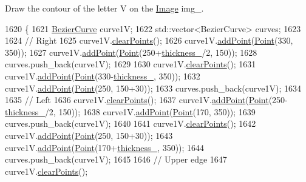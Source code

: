 Draw the contour of the letter V on the \mbox{\hyperlink{class_image}{Image}} img\+\_\+. 


\begin{DoxyCode}
1620                \{
1621     \mbox{\hyperlink{class_bezier_curve}{BezierCurve}} curve1V;
1622     std::vector<BezierCurve> curves;
1623 
1624     \textcolor{comment}{// Right}
1625     curve1V.\mbox{\hyperlink{class_bezier_curve_a0ba8ce66d5af5971ae6a1b506029728e}{clearPoints}}();
1626     curve1V.\mbox{\hyperlink{class_bezier_curve_a38d16c18b36ae45619b05e26e226cf34}{addPoint}}(\mbox{\hyperlink{class_point}{Point}}(330, 350));
1627     curve1V.\mbox{\hyperlink{class_bezier_curve_a38d16c18b36ae45619b05e26e226cf34}{addPoint}}(\mbox{\hyperlink{class_point}{Point}}(250+\mbox{\hyperlink{class_font_v1_aed8040e76be9a52833627b92f0fb4e5f}{thickness\_}}/2, 150));
1628     curves.push\_back(curve1V);
1629 
1630     curve1V.\mbox{\hyperlink{class_bezier_curve_a0ba8ce66d5af5971ae6a1b506029728e}{clearPoints}}();
1631     curve1V.\mbox{\hyperlink{class_bezier_curve_a38d16c18b36ae45619b05e26e226cf34}{addPoint}}(\mbox{\hyperlink{class_point}{Point}}(330-\mbox{\hyperlink{class_font_v1_aed8040e76be9a52833627b92f0fb4e5f}{thickness\_}}, 350));
1632     curve1V.\mbox{\hyperlink{class_bezier_curve_a38d16c18b36ae45619b05e26e226cf34}{addPoint}}(\mbox{\hyperlink{class_point}{Point}}(250, 150+30));
1633     curves.push\_back(curve1V);
1634 
1635     \textcolor{comment}{// Left}
1636     curve1V.\mbox{\hyperlink{class_bezier_curve_a0ba8ce66d5af5971ae6a1b506029728e}{clearPoints}}();
1637     curve1V.\mbox{\hyperlink{class_bezier_curve_a38d16c18b36ae45619b05e26e226cf34}{addPoint}}(\mbox{\hyperlink{class_point}{Point}}(250-\mbox{\hyperlink{class_font_v1_aed8040e76be9a52833627b92f0fb4e5f}{thickness\_}}/2, 150));
1638     curve1V.\mbox{\hyperlink{class_bezier_curve_a38d16c18b36ae45619b05e26e226cf34}{addPoint}}(\mbox{\hyperlink{class_point}{Point}}(170, 350));
1639     curves.push\_back(curve1V);
1640 
1641     curve1V.\mbox{\hyperlink{class_bezier_curve_a0ba8ce66d5af5971ae6a1b506029728e}{clearPoints}}();
1642     curve1V.\mbox{\hyperlink{class_bezier_curve_a38d16c18b36ae45619b05e26e226cf34}{addPoint}}(\mbox{\hyperlink{class_point}{Point}}(250, 150+30));
1643     curve1V.\mbox{\hyperlink{class_bezier_curve_a38d16c18b36ae45619b05e26e226cf34}{addPoint}}(\mbox{\hyperlink{class_point}{Point}}(170+\mbox{\hyperlink{class_font_v1_aed8040e76be9a52833627b92f0fb4e5f}{thickness\_}}, 350));
1644     curves.push\_back(curve1V);
1645 
1646     \textcolor{comment}{// Upper edge}
1647     curve1V.\mbox{\hyperlink{class_bezier_curve_a0ba8ce66d5af5971ae6a1b506029728e}{clearPoints}}();

\end{DoxyCode}

